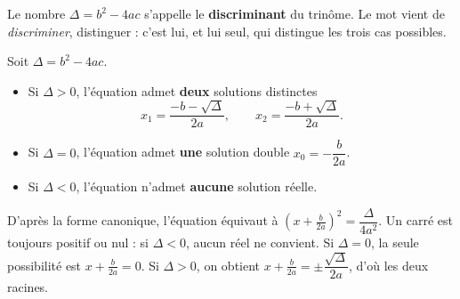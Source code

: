 \begin{definition}[discriminant]
Le nombre $\Delta = b^{2}-4ac$ s'appelle le \textbf{discriminant} du trinôme.
Le mot vient de \emph{discriminer}, distinguer : c'est lui, et lui seul, qui
distingue les trois cas possibles.
\end{definition}

\begin{theoreme}[résolution de $ax^{2}+bx+c = 0$]
Soit $\Delta = b^{2}-4ac$.
\begin{itemize}[leftmargin=1.3em, itemsep=0.2em]
  \item Si $\Delta > 0$, l'équation admet \textbf{deux} solutions distinctes
        \[
          x_{1} = \frac{-b-\sqrt{\Delta}}{2a}, \qquad
          x_{2} = \frac{-b+\sqrt{\Delta}}{2a} .
        \]
  \item Si $\Delta = 0$, l'équation admet \textbf{une} solution double
        $x_{0} = -\dfrac{b}{2a}$.
  \item Si $\Delta < 0$, l'équation n'admet \textbf{aucune} solution réelle.
\end{itemize}
\end{theoreme}

\begin{demonstration}
D'après la forme canonique, l'équation équivaut à
$\left(x+\frac{b}{2a}\right)^{2} = \dfrac{\Delta}{4a^{2}}$. Un carré est
toujours positif ou nul : si $\Delta<0$, aucun réel ne convient. Si
$\Delta = 0$, la seule possibilité est $x+\frac{b}{2a} = 0$. Si $\Delta>0$,
on obtient $x+\frac{b}{2a} = \pm\dfrac{\sqrt\Delta}{2a}$, d'où les deux
racines.
\end{demonstration}

